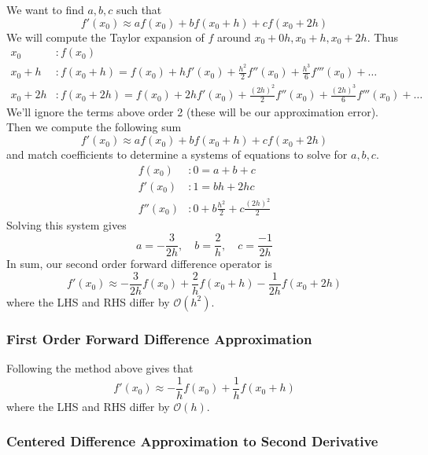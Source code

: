 \documentclass[12pt]{article}
\theoremstyle{definition}
\theoremstyle{definition}
\begin{document}
We want to find $a,b,c$ such that
\begin{equation}
	f'(x_0) \approx af(x_0) + bf(x_0 + h) + cf(x_0 + 2h)
\end{equation}
We will compute the Taylor expansion of $f$ around $x_0 + 0h, x_0+h, x_0+2h$. Thus
\begin{align*}
	x_0 &: f(x_0) \\
	x_0 + h &: f(x_0 + h) = f(x_0) + h f'(x_0) + \frac{h^2}{2}f''(x_0) + \frac{h^3}{6}f'''(x_0) + \ldots \\
	x_0 + 2h &: f(x_0 + 2h) = f(x_0) + 2h f'(x_0) + \frac{(2h)^2}{2}f''(x_0) + \frac{(2h)^3}{6}f'''(x_0) + \ldots 
\end{align*}
We'll ignore the terms above order 2 (these will be our approximation error). Then we compute the following sum
\begin{equation}
	f'(x_0) \approx af(x_0) + bf(x_0 + h) + cf(x_0 + 2h)
\end{equation}
and match coefficients to determine a systems of equations to solve for $a,b,c$.
\begin{align*}
	f(x_0) &: 0 = a + b + c \\
	f'(x_0) &: 1 = bh + 2hc \\
	f''(x_0) &: 0 + b\frac{h^2}{2} + c \frac{(2h)^2}{2}
\end{align*}
Solving this system gives
\begin{equation}
	a = -\frac{3}{2h}, \quad b = \frac{2}{h}, \quad c = \frac{-1}{2h}
\end{equation}
In sum, our second order forward difference operator is
\begin{equation}
	f'(x_0) \approx -\frac{3}{2h} f(x_0) + \frac{2}{h} f(x_0 + h) - \frac{1}{2h}f(x_0 + 2h)
\end{equation}
where the LHS and RHS differ by $\mathcal{O}(h^2)$. 

\subsubsection{First Order Forward Difference Approximation}

Following the method above gives that
\begin{equation}
	f'(x_0) \approx -\frac{1}{h} f(x_0) + \frac{1}{h}f(x_0 + h)
\end{equation}
where the LHS and RHS differ by $\mathcal{O}(h)$.

\subsubsection{Centered Difference Approximation to Second Derivative}
\end{document}

